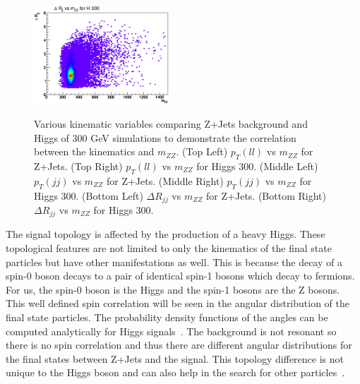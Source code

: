\begin{figure}[htb!]
{\includegraphics[width=0.45\textwidth]{Optimization/mzz_jjdr_300.eps} \\
}
\caption{Various kinematic variables comparing Z+Jets background and Higgs of 300 GeV simulations to demonstrate the correlation between the kinematics and $m_{ZZ}$.  (Top Left) $p_T (ll)$ vs $m_{ZZ}$ for Z+Jets.  (Top Right) $p_T (ll)$ vs $m_{ZZ}$ for Higgs 300. (Middle Left) $p_T (jj)$ vs $m_{ZZ}$ for Z+Jets.  (Middle Right) $p_T (jj)$ vs $m_{ZZ}$ for Higgs 300. (Bottom Left) $\Delta R_{jj}$ vs $m_{ZZ}$ for Z+Jets.  (Bottom Right) $\Delta R_{jj}$ vs $m_{ZZ}$ for Higgs 300. 
\label{fig:nousevars}}  
\end{figure}

The signal topology is affected by the production of a heavy Higgs.  These topological features are not limited to only the kinematics of the final state particles but have other manifestations as well.  This is because the decay of a spin-0 boson decays to a pair of identical spin-1 bosons which decay to fermions.  For us, the spin-0 boson is the Higgs and the spin-1 bosons are the Z bosons.  This well defined spin correlation will be seen in the angular distribution of the final state particles.  The probability density functions of the angles can be computed analytically for Higgs signals~\cite{Physics_2010}.  The background is not resonant so there is no spin correlation and thus there are different angular distributions for the final states between Z+Jets and the signal.  This topology difference is not unique to the Higgs boson and can also help in the search for other particles~\cite{PhysRevD.81.075022}. 

